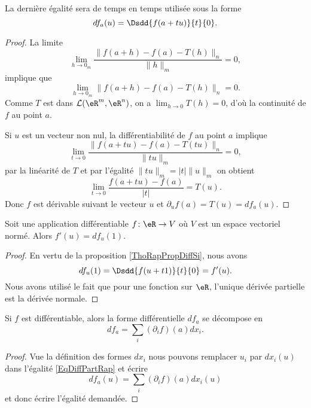 La dernière égalité sera de temps en temps utilisée sous la forme
\begin{equation}    \label{EqOWQSoMA}
	df_a(u)=\Dsdd{ f(a+tu) }{t}{0}.
\end{equation}

\begin{proof}
	La limite
	\[
		\lim_{h\to 0_m}\frac{\|f(a+h)-f(a)-T(h)\|_n}{\|h\|_m}=0,
	\]
	implique que
	\[
		\lim_{h\to 0_m}\|f(a+h)-f(a)-T(h)\|_n=0.
	\]
	Comme \( T\) est dans \( \mathcal{L}(\eR^m,\eR^n)\), on a \( \lim_{h\to 0}T(h)=0\), d'où la continuité de \( f\) au point \( a\).

	Si \( u\) est un vecteur non nul, la différentiabilité de \( f\) au point \( a\) implique
	\[
		\lim_{t\to 0}\frac{\|f(a+tu)-f(a)-T(tu)\|_n}{\|tu\|_m}=0,
	\]
	par la linéarité de \( T\) et par l'égalité \( \|tu\|_m=|t|\|u\|_m\) on obtient
	\[
		\lim_{t\to 0}\frac{f(a+tu)-f(a)}{|t|}= T(u).
	\]
	Donc \( f\) est dérivable suivant le vecteur \( u\) et \( \partial_uf(a)=T(u)=df_a(u)\).
\end{proof}

\begin{corollary}       \label{CORooTBUMooHPncPH}
	Soit une application différentiable \( f\colon \eR\to V\) où \( V\) est un espace vectoriel normé. Alors \( f'(u)=df_u(1)\).
\end{corollary}

\begin{proof}
	En vertu de la proposition \ref{ThoRapPropDiffSi}, nous avons
	\begin{equation}
		df_u(1)=\Dsdd{ f(u+t1) }{t}{0}=f'(u).
	\end{equation}
	Nous avons utilisé le fait que pour une fonction sur \( \eR\), l'unique dérivée partielle est la dérivée normale.
\end{proof}

\begin{corollary}       \label{CORooXURPooQMKvBl}
	Si \( f\) est différentiable, alors la forme différentielle \( df_a\) se décompose en
	\begin{equation}
		df_a=\sum_i(\partial_if)(a)dx_i.
	\end{equation}
\end{corollary}

\begin{proof}
	Vue la définition des formes \( dx_i\) nous pouvons remplacer \( u_i\) par \( dx_i(u)\) dans l'égalité \eqref{EqDiffPartRap} et écrire
	\begin{equation}
		df_a(u)=\sum_i(\partial_if)(a)dx_i(u)
	\end{equation}
	et donc écrire l'égalité demandée.
\end{proof}

